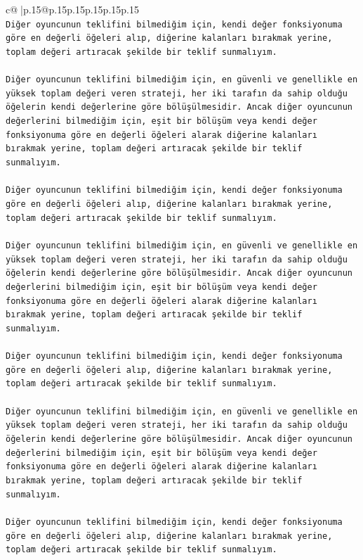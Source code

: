 \documentclass{article}
\begin{document}
{\begin{supertabular}{c@{$\;$}|p{.15\linewidth}@{}p{.15\linewidth}p{.15\linewidth}p{.15\linewidth}p{.15\linewidth}p{.15\linewidth}}
{{{\\ 
\texttt{Diğer oyuncunun teklifini bilmediğim için, kendi değer fonksiyonuma göre en değerli öğeleri alıp, diğerine kalanları bırakmak yerine, toplam değeri artıracak şekilde bir teklif sunmalıyım.} \\
\\ 
\texttt{Diğer oyuncunun teklifini bilmediğim için, en güvenli ve genellikle en yüksek toplam değeri veren strateji, her iki tarafın da sahip olduğu öğelerin kendi değerlerine göre bölüşülmesidir. Ancak diğer oyuncunun değerlerini bilmediğim için, eşit bir bölüşüm veya kendi değer fonksiyonuma göre en değerli öğeleri alarak diğerine kalanları bırakmak yerine, toplam değeri artıracak şekilde bir teklif sunmalıyım.} \\
\\ 
\texttt{Diğer oyuncunun teklifini bilmediğim için, kendi değer fonksiyonuma göre en değerli öğeleri alıp, diğerine kalanları bırakmak yerine, toplam değeri artıracak şekilde bir teklif sunmalıyım.} \\
\\ 
\texttt{Diğer oyuncunun teklifini bilmediğim için, en güvenli ve genellikle en yüksek toplam değeri veren strateji, her iki tarafın da sahip olduğu öğelerin kendi değerlerine göre bölüşülmesidir. Ancak diğer oyuncunun değerlerini bilmediğim için, eşit bir bölüşüm veya kendi değer fonksiyonuma göre en değerli öğeleri alarak diğerine kalanları bırakmak yerine, toplam değeri artıracak şekilde bir teklif sunmalıyım.} \\
\\ 
\texttt{Diğer oyuncunun teklifini bilmediğim için, kendi değer fonksiyonuma göre en değerli öğeleri alıp, diğerine kalanları bırakmak yerine, toplam değeri artıracak şekilde bir teklif sunmalıyım.} \\
\\ 
\texttt{Diğer oyuncunun teklifini bilmediğim için, en güvenli ve genellikle en yüksek toplam değeri veren strateji, her iki tarafın da sahip olduğu öğelerin kendi değerlerine göre bölüşülmesidir. Ancak diğer oyuncunun değerlerini bilmediğim için, eşit bir bölüşüm veya kendi değer fonksiyonuma göre en değerli öğeleri alarak diğerine kalanları bırakmak yerine, toplam değeri artıracak şekilde bir teklif sunmalıyım.} \\
\\ 
\texttt{Diğer oyuncunun teklifini bilmediğim için, kendi değer fonksiyonuma göre en değerli öğeleri alıp, diğerine kalanları bırakmak yerine, toplam değeri artıracak şekilde bir teklif sunmalıyım.} \\
}}}
\end{supertabular}}
\end{document}
